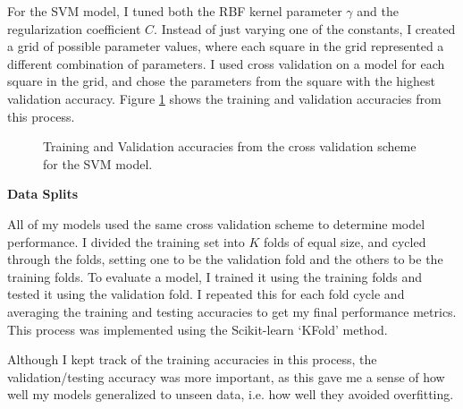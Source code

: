 \documentclass{ws-ijprai}
\newcommand{\subheader}[1]{\bigskip\begin{center}\textbf{#1}\end{center}}
\begin{document}
For the SVM model, I tuned both the RBF kernel parameter $\gamma$ and the regularization coefficient $C$. Instead of just varying one of the constants, I created a grid of possible parameter values, where each square in the grid represented a different combination of parameters. I used cross validation on a model for each square in the grid, and chose the parameters from the square with the highest validation accuracy. Figure \ref{fig:svm-params} shows the training and validation accuracies from this process.

\begin{figure}[H]
  \centering
  \caption{Training and Validation accuracies from the cross validation scheme for the SVM model.}
  \label{fig:svm-params}
\end{figure}


\subheader{Data Splits}

All of my models used the same cross validation scheme to determine model performance. I divided the training set into $K$ folds of equal size, and cycled through the folds, setting one to be the validation fold and the others to be the training folds. To evaluate a model, I trained it using the training folds and tested it using the validation fold. I repeated this for each fold cycle and averaging the training and testing accuracies to get my final performance metrics. This process was implemented using the Scikit-learn `KFold' method.

Although I kept track of the training accuracies in this process, the validation/testing accuracy was more important, as this gave me a sense of how well my models generalized to unseen data, i.e. how well they avoided overfitting.
\end{document}
